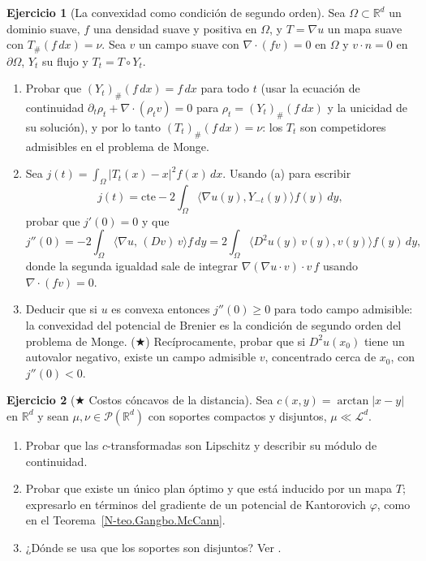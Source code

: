 \documentclass[11pt,a4paper]{amsart}
\newcounter{chapter}
\newcommand{\R}{{\mathbb R}}
\newcommand{\LL}{{\mathcal L}}
\theoremstyle{remark}
\theoremstyle{definition}
\newtheorem{ejercicio}{Ejercicio}[chapter]
\numberwithin{subsection}{section}
\numberwithin{equation}{section}
\begin{document}
\begin{ejercicio}[La convexidad como condición de segundo orden]\label{ejer.Brenier.segunda.variacion}
Sea $\Omega\subset\R^d$ un dominio suave, $f$ una densidad suave y positiva
en $\Omega$, y $T=\nabla u$ un mapa suave con $T_\#(f\,dx)=\nu$. Sea $v$ un
campo suave con $\nabla\cdot(fv)=0$ en $\Omega$ y $v\cdot n=0$ en
$\partial\Omega$, $Y_t$ su flujo y $T_t=T\circ Y_t$.
\begin{enumerate}[label=(\alph*)]
\item Probar que $(Y_t)_\#(f\,dx)=f\,dx$ para todo $t$ (usar la ecuación de
continuidad $\partial_t\rho_t+\nabla\cdot(\rho_tv)=0$ para $\rho_t=(Y_t)_\#(f\,dx)$
y la unicidad de su solución), y por lo tanto $(T_t)_\#(f\,dx)=\nu$: los
$T_t$ son competidores admisibles en el problema de Monge.
\item Sea $j(t)=\int_\Omega|T_t(x)-x|^2f(x)\,dx$. Usando (a) para escribir
\[
j(t)=\text{cte}-2\int_\Omega\langle\nabla u(y),Y_{-t}(y)\rangle f(y)\,dy,
\]
probar que $j'(0)=0$ y que
\[
j''(0)=-2\int_\Omega\bigl\langle\nabla u,\,(Dv)\,v\bigr\rangle f\,dy
=2\int_\Omega\bigl\langle D^2u(y)\,v(y),v(y)\bigr\rangle f(y)\,dy ,
\]
donde la segunda igualdad sale de integrar $\nabla(\nabla u\cdot v)\cdot v\,f$
usando $\nabla\cdot(fv)=0$.
\item Deducir que si $u$ es convexa entonces $j''(0)\ge0$ para todo campo
admisible: la convexidad del potencial de Brenier es la condición de
segundo orden del problema de Monge. ($\bigstar$) Recíprocamente, probar que
si $D^2u(x_0)$ tiene un autovalor negativo, existe un campo admisible $v$,
concentrado cerca de $x_0$, con $j''(0)<0$.
\end{enumerate}
\end{ejercicio}

\begin{ejercicio}[$\bigstar$ Costos cóncavos de la distancia]\label{ejer.Brenier.arctan}
Sea $c(x,y)=\arctan|x-y|$ en $\R^d$ y sean $\mu,\nu\in\mathcal P(\R^d)$ con
soportes compactos y disjuntos, $\mu\ll\LL^d$.
\begin{enumerate}[label=(\alph*)]
\item Probar que las $c$-transformadas son Lipschitz y describir su módulo
de continuidad.
\item Probar que existe un único plan óptimo y que está inducido por un
mapa $T$; expresarlo en términos del gradiente de un potencial de
Kantorovich $\varphi$, como en el Teorema~\ref{N-teo.Gangbo.McCann}.
\item ¿Dónde se usa que los soportes son disjuntos? Ver
\cite[Sec.~3.3.2]{Santambrogio}.
\end{enumerate}
\end{ejercicio}



\end{document}
